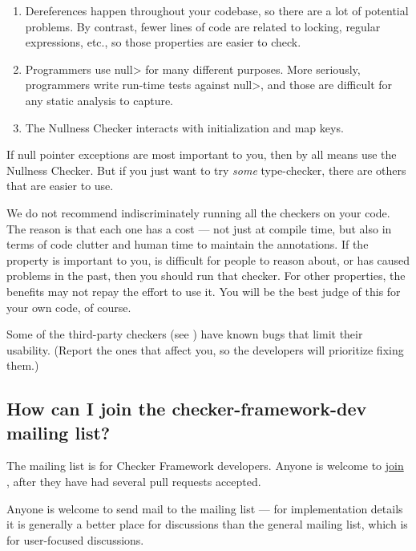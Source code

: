 \begin{enumerate}
\item
  Dereferences happen throughout your codebase, so there are a lot of
  potential problems.  By contrast, fewer lines of code are related to
  locking, regular expressions, etc., so those properties are easier to
  check.
\item
  Programmers use \<null> for many different purposes.  More seriously,
  programmers write run-time tests against \<null>, and those are difficult
  for any static analysis to capture.
\item
  The Nullness Checker interacts with initialization and map keys.
\end{enumerate}

If null pointer exceptions are most important to you, then by all means use
the Nullness Checker.  But if you just want to try \emph{some}
type-checker, there are others that are easier to use.

We do not recommend indiscriminately running all the checkers on your code.
The reason is that each one has a cost --- not just at compile time, but
also in terms of code clutter and human time to maintain the annotations.
If the property is important to you, is difficult for people to reason
about, or has caused problems in the past, then you should run that
checker.  For other properties, the benefits may not repay the effort to
use it.  You will be the best judge of this for your own code, of course.

Some of the third-party checkers (see
)
have known bugs that limit their
usability.  (Report the ones that affect you, so the developers
will prioritize fixing them.)


\subsection{How can I join the checker-framework-dev mailing list?\label{faq-checker-framework-dev}}

The  mailing list is for
Checker Framework developers.  Anyone is welcome to
\href{https://groups.google.com/forum/#!forum/checker-framework-dev}{join
  }, after they have had several pull requests
accepted.

Anyone is welcome to send mail to the
 mailing list --- for
implementation details it is generally a better place for discussions than
the general  mailing list,
which is for user-focused discussions.

